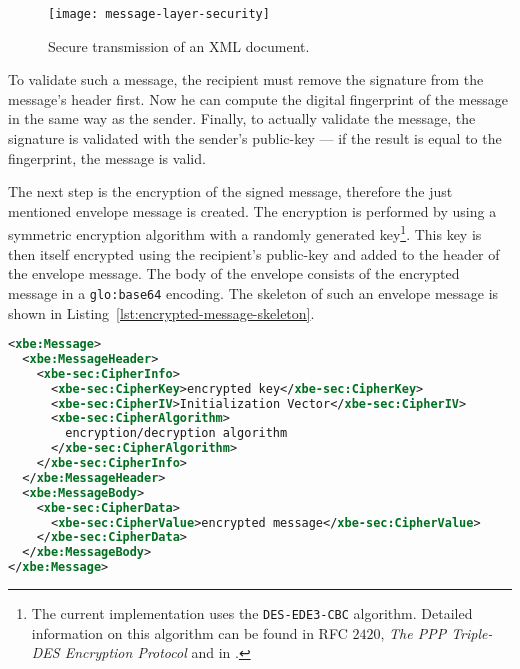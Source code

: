 \begin{figure}[ht]
  \centering
  \texttt{[image: message-layer-security]}
  \caption[Message Layer Security]{Secure transmission of an XML document.}
  \label{fig:net-mls}
\end{figure}

To validate such  a message, the recipient must  remove the signature from
the message's header first. Now  he can compute the digital fingerprint of
the message in the same way  as the sender.  Finally, to actually validate
the message, the  signature is validated with the  sender's public-key ---
if the result is equal to the fingerprint, the message is valid.

The next step is the encryption  of the signed message, therefore the just
mentioned  envelope message is  created.  The  encryption is  performed by
using  a   symmetric  encryption  algorithm  with   a  randomly  generated
key\footnote{The  current  implementation  uses the  \texttt{DES-EDE3-CBC}
  algorithm.  Detailed information  on this algorithm can be  found in RFC
  $2420$,   \emph{The   PPP  Triple-DES   Encryption   Protocol}  and   in
  \cite{schneier95}.}.   This  key  is  then itself  encrypted  using  the
recipient's public-key  and added to  the header of the  envelope message.
The  body  of  the  envelope  consists  of  the  encrypted  message  in  a
\texttt{\gls{glo:base64}}  encoding.   The skeleton  of  such an  envelope
message is shown in Listing~\ref{lst:encrypted-message-skeleton}.

\medskip
\begin{center}
  \begin{minipage}{.9\textwidth}
    \begin{lstlisting}[captionpos=b,backgroundcolor=\color{listingcolor},frame=lines,numbers=none,stepnumber=5,numberfirstline=false,numberstyle=\tiny,caption={The
        skeleton of an encrypted message.},label={lst:encrypted-message-skeleton},language=XML]
<xbe:Message>
  <xbe:MessageHeader>
    <xbe-sec:CipherInfo>
      <xbe-sec:CipherKey>encrypted key</xbe-sec:CipherKey>
      <xbe-sec:CipherIV>Initialization Vector</xbe-sec:CipherIV>
      <xbe-sec:CipherAlgorithm>
        encryption/decryption algorithm
      </xbe-sec:CipherAlgorithm>
    </xbe-sec:CipherInfo>
  </xbe:MessageHeader>
  <xbe:MessageBody>
    <xbe-sec:CipherData>
      <xbe-sec:CipherValue>encrypted message</xbe-sec:CipherValue>
    </xbe-sec:CipherData>
  </xbe:MessageBody>
</xbe:Message>
    \end{lstlisting}
  \end{minipage}
\end{center}

